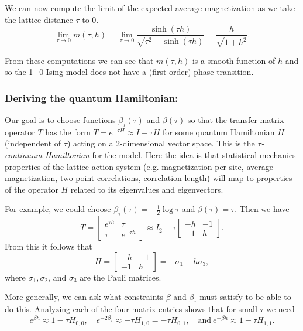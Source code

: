 \documentclass[11pt,reqno]{amsart}
\numberwithin{equation}{section}
\begin{document}
	We can now compute the limit of the expected average magnetization as we take the lattice distance $\tau$ to 0.
		\[ \lim_{\tau \to 0} m(\tau,h) = \lim_{\tau \to 0} \frac{\sinh(\tau h)}{\sqrt{\tau^2+\sinh(\tau h)}} = \frac{h}{\sqrt{1+h^2}}. \]
		
	From these computations we can see that $m(\tau,h)$ is a smooth function of $h$ and so the 1+0 Ising model does not have a (first-order) phase transition.
	
	\subsubsection{Deriving the quantum Hamiltonian:}
	
	Our goal is to choose functions $\beta_\tau(\tau)$ and $\beta(\tau)$ so that the transfer matrix operator $T$ has the form $T=e^{-\tau H} \approx I-\tau H$ for some quantum Hamiltonian $H$ (independent of $\tau$) acting on a $2$-dimensional vector space. 
	This is the \emph{$\tau$-continuum Hamiltonian} for the model. 
	Here the idea is that statistical mechanics properties of the lattice action system (e.g. magnetization per site, average magnetization, two-point correlations, correlation length) will map to properties of the operator $H$ related to its eigenvalues and eigenvectors.
	
	For example, we could choose $\beta_\tau(\tau)=-\frac{1}{2}\log \tau$ and $\beta(\tau)=\tau$. Then we have \[T=\begin{bmatrix}
	e^{\tau h} & \tau \\
	\tau & e^{-\tau h}
	\end{bmatrix} \approx I_2-\tau\begin{bmatrix}
	-h & -1 \\
	-1 & h
	\end{bmatrix}.\] 
	From this it follows that \[H=\begin{bmatrix}
	-h & -1 \\
	-1 & h
	\end{bmatrix}=-\sigma_1-h\sigma_3, \] where $\sigma_1,\sigma_2$, and $\sigma_3$ are the Pauli matrices. 
	
	More generally, we can ask what constraints $\beta$ and $\beta_\tau$ must satisfy to be able to do this. 
	Analyzing each of the four matrix entries shows that for small $\tau$ we need 
	\[e^{\beta h} \approx 1-\tau H_{0,0}, \quad e^{-2\beta_\tau} \approx -\tau H_{1,0}=-\tau H_{0,1},\quad \text{and} \ e^{-\beta h} \approx 1- \tau H_{1,1}. \]
	
\end{document}

